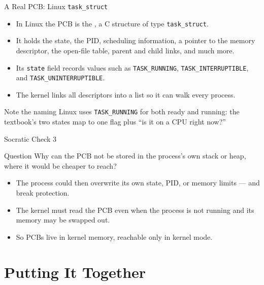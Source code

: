 \documentclass[aspectratio=169]{beamer}
\begin{document}
\begin{frame}{A Real PCB: Linux \texttt{task\_struct}}
  \begin{itemize}
    \item In Linux the PCB is the , a C structure
      of type \texttt{task\_struct}.
    \item It holds the state, the PID, scheduling information, a pointer to
      the memory descriptor, the open-file table, parent and child links,
      and much more.
    \item Its \texttt{state} field records values such as
      \texttt{TASK\_RUNNING}, \texttt{TASK\_INTERRUPTIBLE}, and
      \texttt{TASK\_UNINTERRUPTIBLE}.
    \item The kernel links all descriptors into a list so it can walk every
      process.
  \end{itemize}
  \vspace{0.2cm}
  \begin{block}{Note the naming}
    Linux uses \texttt{TASK\_RUNNING} for both ready and running: the
    textbook's two states map to one flag plus ``is it on a CPU right now?''
  \end{block}
\end{frame}

\begin{frame}{Socratic Check 3}
  \begin{block}{Question}
    Why can the PCB not be stored in the process's own stack or heap, where it
    would be cheaper to reach?
  \end{block}
  \vspace{0.25cm}
  \begin{itemize}
    \item The process could then overwrite its own state, PID, or memory
      limits --- and break protection.
    \item The kernel must read the PCB even when the process is not running
      and its memory may be swapped out.
    \item So PCBs live in kernel memory, reachable only in kernel mode.
  \end{itemize}
\end{frame}

\section{Putting It Together}
\end{document}
